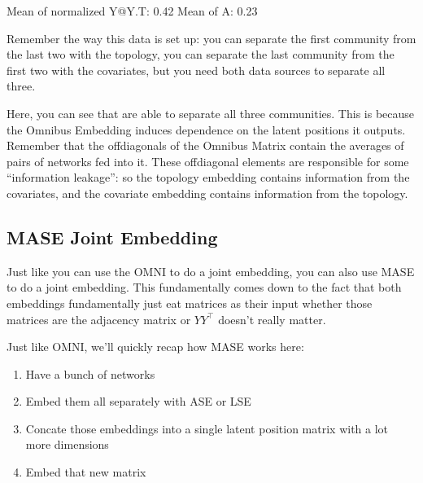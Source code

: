 \documentclass[letterpaper,10pt,english]{jupyterBook}
\begin{document}
\begin{sphinxVerbatim}[commandchars=\\\{\}]
Mean of normalized Y@Y.T: 0.42
Mean of A: 0.23
\end{sphinxVerbatim}

\sphinxAtStartPar
Remember the way this data is set up: you can separate the first community from the last two with the topology, you can separate the last community from the first two with the covariates, but you need both data sources to separate all three.

\sphinxAtStartPar
Here, you can see that  are able to separate all three communities. This is because the Omnibus Embedding induces dependence on the latent positions it outputs. Remember that the off\sphinxhyphen{}diagonals of the Omnibus Matrix contain the averages of pairs of networks fed into it. These off\sphinxhyphen{}diagonal elements are responsible for some “information leakage”: so the topology embedding contains information from the covariates, and the covariate embedding contains information from the topology.


\subsection{MASE Joint Embedding}
\label{\detokenize{representations/ch6/joint-representation-learning:mase-joint-embedding}}
\sphinxAtStartPar
Just like you can use the OMNI to do a joint embedding, you can also use MASE to do a joint embedding. This fundamentally comes down to the fact that both embeddings fundamentally just eat matrices as their input \sphinxhyphen{} whether those matrices are the adjacency matrix or \(YY^\top\) doesn’t really matter.

\sphinxAtStartPar
Just like OMNI, we’ll quickly recap how MASE works here:
\begin{enumerate}
%
\item {} 
\sphinxAtStartPar
Have a bunch of networks

\item {} 
\sphinxAtStartPar
Embed them all separately with ASE or LSE

\item {} 
\sphinxAtStartPar
Concate those embeddings into a single latent position matrix with a lot more dimensions

\item {} 
\sphinxAtStartPar
Embed that new matrix

\end{enumerate}
\end{document}
